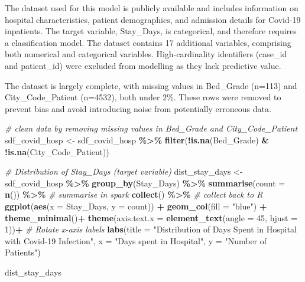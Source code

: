 \documentclass[
]{article}
\newenvironment{Shaded}{\begin{snugshade}}{\end{snugshade}}
\newcommand{\AttributeTok}[1]{\textcolor[rgb]{0.13,0.29,0.53}{#1}}
\newcommand{\CommentTok}[1]{\textcolor[rgb]{0.56,0.35,0.01}{\textit{#1}}}
\newcommand{\DecValTok}[1]{\textcolor[rgb]{0.00,0.00,0.81}{#1}}
\newcommand{\FunctionTok}[1]{\textcolor[rgb]{0.13,0.29,0.53}{\textbf{#1}}}
\newcommand{\NormalTok}[1]{#1}
\newcommand{\OtherTok}[1]{\textcolor[rgb]{0.56,0.35,0.01}{#1}}
\newcommand{\SpecialCharTok}[1]{\textcolor[rgb]{0.81,0.36,0.00}{\textbf{#1}}}
\newcommand{\StringTok}[1]{\textcolor[rgb]{0.31,0.60,0.02}{#1}}
\begin{document}
The dataset used for this model is publicly available and includes
information on hospital characteristics, patient demographics, and
admission details for Covid-19 inpatients. The target variable,
Stay\_Days, is categorical, and therefore requires a classification
model. The dataset contains 17 additional variables, comprising both
numerical and categorical variables. High-cardinality identifiers
(case\_id and patient\_id) were excluded from modelling as they lack
predictive value.

The dataset is largely complete, with missing values in Bed\_Grade
(n=113) and City\_Code\_Patient (n=4532), both under 2\%. These rows
were removed to prevent bias and avoid introducing noise from
potentially erroneous data.

\begin{Shaded}
\begin{Highlighting}[]
\CommentTok{\# clean data by removing missing values in Bed\_Grade and City\_Code\_Patient}
\NormalTok{sdf\_covid\_hosp }\OtherTok{\textless{}{-}}\NormalTok{ sdf\_covid\_hosp }\SpecialCharTok{\%\textgreater{}\%} 
  \FunctionTok{filter}\NormalTok{(}\SpecialCharTok{!}\FunctionTok{is.na}\NormalTok{(Bed\_Grade) }\SpecialCharTok{\&} \SpecialCharTok{!}\FunctionTok{is.na}\NormalTok{(City\_Code\_Patient))}
\end{Highlighting}
\end{Shaded}

\begin{Shaded}
\begin{Highlighting}[]
\CommentTok{\# Distribution of Stay\_Days (target variable)}
\NormalTok{dist\_stay\_days }\OtherTok{\textless{}{-}}\NormalTok{ sdf\_covid\_hosp }\SpecialCharTok{\%\textgreater{}\%}
  \FunctionTok{group\_by}\NormalTok{(Stay\_Days) }\SpecialCharTok{\%\textgreater{}\%} 
  \FunctionTok{summarise}\NormalTok{(}\AttributeTok{count =} \FunctionTok{n}\NormalTok{()) }\SpecialCharTok{\%\textgreater{}\%} \CommentTok{\# summarise in spark }
  \FunctionTok{collect}\NormalTok{() }\SpecialCharTok{\%\textgreater{}\%} \CommentTok{\# collect back to R}
  \FunctionTok{ggplot}\NormalTok{(}\FunctionTok{aes}\NormalTok{(}\AttributeTok{x =}\NormalTok{ Stay\_Days, }\AttributeTok{y =}\NormalTok{ count)) }\SpecialCharTok{+}
  \FunctionTok{geom\_col}\NormalTok{(}\AttributeTok{fill =} \StringTok{"blue"}\NormalTok{) }\SpecialCharTok{+}
  \FunctionTok{theme\_minimal}\NormalTok{()}\SpecialCharTok{+}
  \FunctionTok{theme}\NormalTok{(}\AttributeTok{axis.text.x =} \FunctionTok{element\_text}\NormalTok{(}\AttributeTok{angle =} \DecValTok{45}\NormalTok{, }\AttributeTok{hjust =} \DecValTok{1}\NormalTok{))}\SpecialCharTok{+} \CommentTok{\# Rotate x{-}axis labels}
  \FunctionTok{labs}\NormalTok{(}\AttributeTok{title =} \StringTok{"Distribution of Days Spent in Hospital with Covid{-}19 Infection"}\NormalTok{, }\AttributeTok{x =} \StringTok{"Days spent in Hospital"}\NormalTok{, }\AttributeTok{y =} \StringTok{"Number of Patients"}\NormalTok{)}

\NormalTok{dist\_stay\_days}
\end{Highlighting}
\end{Shaded}
\end{document}
